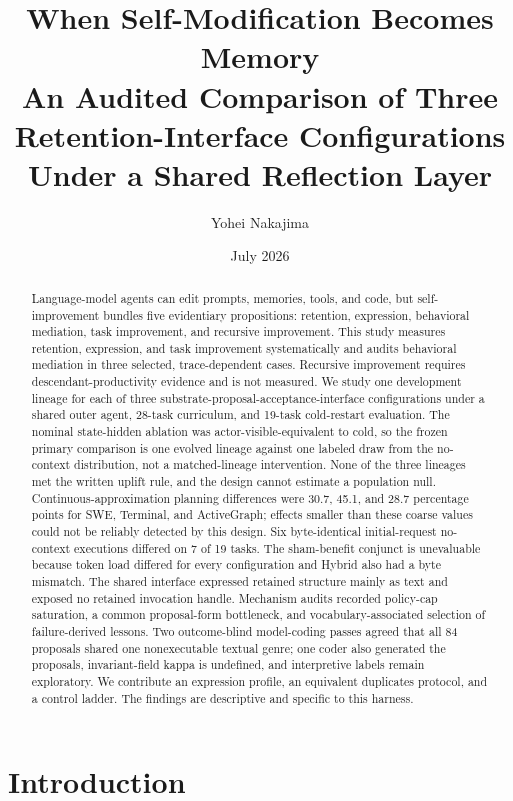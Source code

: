 \documentclass[10pt,twocolumn]{article}
\title{\vspace{-1.6em}\textbf{When Self-Modification Becomes Memory}\\
\large An Audited Comparison of Three Retention-Interface Configurations\\
Under a Shared Reflection Layer}
\author{Yohei Nakajima}
\date{July 2026}
\begin{document}
\maketitle
\vspace{-1.5em}

\begin{abstract}

Language-model agents can edit prompts, memories, tools, and code, but
self-improvement bundles five evidentiary propositions: retention,
expression, behavioral mediation, task improvement, and recursive
improvement. This study measures retention, expression, and task
improvement systematically and audits behavioral mediation in three
selected, trace-dependent cases. Recursive improvement requires
descendant-productivity evidence and is not measured. We study one
development lineage for each of three
substrate-proposal-acceptance-interface configurations under a shared
outer agent, 28-task curriculum, and 19-task cold-restart evaluation.
The nominal state-hidden ablation was actor-visible-equivalent to cold,
so the frozen primary comparison is one evolved lineage against one
labeled draw from the no-context distribution, not a matched-lineage
intervention. None of the three lineages met the written uplift rule,
and the design cannot estimate a population null.
Continuous-approximation planning differences were 30.7, 45.1, and 28.7
percentage points for SWE, Terminal, and ActiveGraph; effects smaller
than these coarse values could not be reliably detected by this design.
Six byte-identical initial-request no-context executions differed on 7
of 19 tasks. The sham-benefit conjunct is unevaluable because token load
differed for every configuration and Hybrid also had a byte mismatch.
The shared interface expressed retained structure mainly as text and
exposed no retained invocation handle. Mechanism audits recorded
policy-cap saturation, a common proposal-form bottleneck, and
vocabulary-associated selection of failure-derived lessons. Two
outcome-blind model-coding passes agreed that all 84 proposals shared
one nonexecutable textual genre; one coder also generated the proposals,
invariant-field kappa is undefined, and interpretive labels remain
exploratory. We contribute an expression profile, an equivalent
duplicates protocol, and a control ladder. The findings are descriptive
and specific to this harness.

\end{abstract}

\section{Introduction}\label{introduction}
\end{document}

